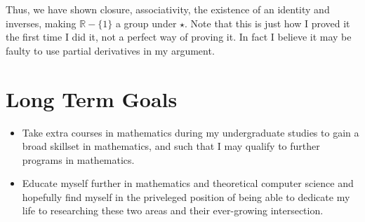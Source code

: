 \documentclass{article}
\begin{document}
Thus, we have shown closure, associativity, the existence of an identity and inverses, making \( \mathbb{R} - \{1\}\) a group under \( \star \).
Note that this is just how I proved it the first time I did it, not a perfect way of proving it. In fact I believe it may be faulty to use partial derivatives in my argument.

\section{Long Term Goals}
\begin{itemize}
  \item Take extra courses in mathematics during my undergraduate studies to gain a broad skillset in mathematics, and such that I may qualify to further programs in mathematics. 
  \item Educate myself further in mathematics and theoretical computer science and hopefully find myself in the priveleged position of being able to dedicate my life to researching these two areas and their ever-growing intersection.
\end{itemize}
\end{document}
